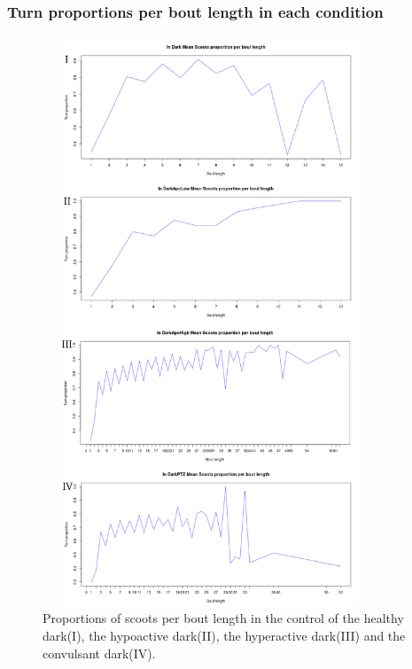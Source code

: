 \documentclass[a4paper,12pt]{article}
\begin{document}
\subsubsection{Turn proportions per bout length in each condition}

\begin{figure}[h!]
\begin{center}
\includegraphics[width=10cm,height=17cm]{boutlengthturnproportion.png}
\caption{Proportions of scoots per bout length in the control of the healthy dark(I), the hypoactive dark(II), the hyperactive dark(III) and the convulsant dark(IV).}
\end{center}
\end{figure}
\newpage
\end{document}
